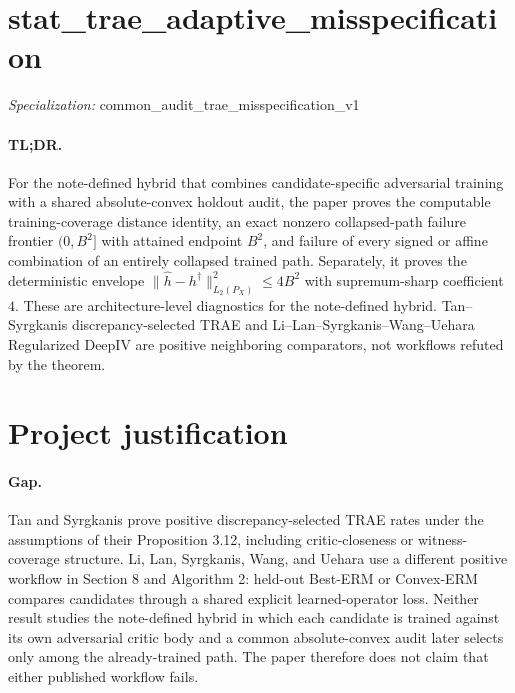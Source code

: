 \documentclass{article}
\begin{document}
\sloppy

\section*{stat\_\allowbreak{}trae\_\allowbreak{}adaptive\_\allowbreak{}misspecification}

\noindent\textit{Specialization:} common\_\allowbreak{}audit\_\allowbreak{}trae\_\allowbreak{}misspecification\_\allowbreak{}v1\par

\paragraph{TL;DR.} For the note-defined hybrid that combines candidate-specific adversarial training with a shared absolute-convex holdout audit, the paper proves the computable training-coverage distance identity, an exact nonzero collapsed-path failure frontier \((0,B^2]\) with attained endpoint \(B^2\), and failure of every signed or affine combination of an entirely collapsed trained path. Separately, it proves the deterministic envelope \(\|\widehat h-h^\dagger\|_{L_2(P_X)}^2\le4B^2\) with supremum-sharp coefficient \(4\). These are architecture-level diagnostics for the note-defined hybrid. Tan--Syrgkanis discrepancy-selected TRAE and Li--Lan--Syrgkanis--Wang--Uehara Regularized DeepIV are positive neighboring comparators, not workflows refuted by the theorem.

\section{Project justification}

\paragraph{Gap.} Tan and Syrgkanis prove positive discrepancy-selected TRAE rates under the assumptions of their Proposition 3.12, including critic-closeness or witness-coverage structure. Li, Lan, Syrgkanis, Wang, and Uehara use a different positive workflow in Section 8 and Algorithm 2: held-out Best-ERM or Convex-ERM compares candidates through a shared explicit learned-operator loss. Neither result studies the note-defined hybrid in which each candidate is trained against its own adversarial critic body and a common absolute-convex audit later selects only among the already-trained path. The paper therefore does not claim that either published workflow fails.
\end{document}
